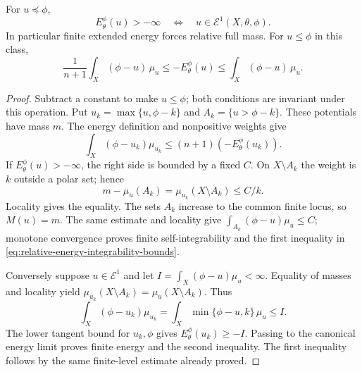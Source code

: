 \begin{theorem}\label{thm:relative-finite-energy-characterization}
For $u\preceq\phi$,
\[
 E_\theta^\phi(u)>-\infty
                    \quad\Longleftrightarrow\quad
                          u\in\mathcal E^1(X,\theta,\phi).
\]
In particular finite extended energy forces relative full mass. For $u\leq\phi$ in this class,
\begin{equation}\label{eq:relative-energy-integrability-bounds}
 \frac1{n+1}\int_X(\phi-u)\,\mu_u
       \leq -E_\theta^\phi(u)
       \leq\int_X(\phi-u)\,\mu_u.
\end{equation}
\end{theorem}
\begin{proof}
Subtract a constant to make $u\leq\phi$; both conditions are invariant under this operation. Put $u_k=\max\{u,\phi-k\}$ and $A_k=\{u>\phi-k\}$. These potentials have mass $m$. The energy definition and nonpositive weights give
\[
 \int_X(\phi-u_k)\mu_{u_k}\leq(n+1)(-E_\theta^\phi(u_k)).
\]
If $E_\theta^\phi(u)>-\infty$, the right side is bounded by a fixed $C$. On $X\setminus A_k$ the weight is $k$ outside a polar set; hence
\[
 m-\mu_u(A_k)=\mu_{u_k}(X\setminus A_k)\leq C/k.
\]
Locality gives the equality. The sets $A_k$ increase to the common finite locus, so $M(u)=m$. The same estimate and locality give
$\int_{A_k}(\phi-u)\mu_u\leq C$; monotone convergence proves finite self-integrability and the first inequality in \eqref{eq:relative-energy-integrability-bounds}.

Conversely suppose $u\in\mathcal E^1$ and let $I=\int_X(\phi-u)\mu_u<\infty$. Equality of masses and locality yield
$\mu_{u_k}(X\setminus A_k)=\mu_u(X\setminus A_k)$. Thus
\[
 \int_X(\phi-u_k)\mu_{u_k}
      =\int_X\min\{\phi-u,k\}\,\mu_u\leq I.
\]
The lower tangent bound for $u_k,\phi$ gives $E_\theta^\phi(u_k)\geq-I$. Passing to the canonical energy limit proves finite energy and the second inequality. The first inequality follows by the same finite-level estimate already proved.
\end{proof}

